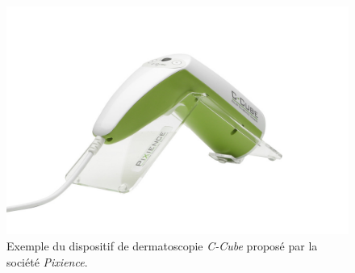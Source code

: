\begin{figure}[H]
    \centering
    \includegraphics[width=0.75\linewidth]{contents/chapter_2/resources/example_device_ccube.jpg}
    \caption{Exemple du dispositif de dermatoscopie \textit{C-Cube} proposé par la société \textit{Pixience}.}
    \label{fig:example_device_ccube}
\end{figure}\par

